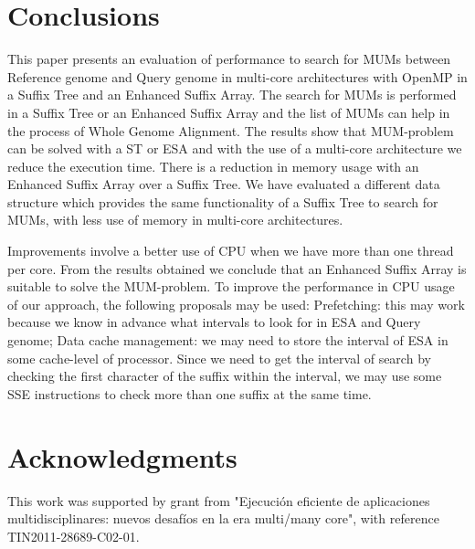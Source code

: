 \documentclass[runningheads,a5paper]{llncs}
\begin{document}
\section{Conclusions}
This paper presents an evaluation of performance to search for MUMs between Reference genome and Query genome in multi-core architectures with OpenMP in a Suffix Tree and an Enhanced Suffix Array. The search for MUMs is performed in a Suffix Tree or an Enhanced Suffix Array and the list of MUMs can help in the process of Whole Genome Alignment. The results show that MUM-problem can be solved with a ST or ESA and with the use of a multi-core architecture we reduce the execution time. There is a reduction in memory usage with an Enhanced Suffix Array over a Suffix Tree. We have evaluated a different data structure which provides the same functionality of a Suffix Tree to search for MUMs, with less use of memory in multi-core architectures.

Improvements involve a better use of CPU when we have more than one thread per core. From the results obtained we conclude that an Enhanced Suffix Array is suitable to solve the MUM-problem. To improve the performance in CPU usage of our approach, the following proposals may be used: Prefetching: this may work because we know in advance what intervals to look for in ESA and Query genome; Data cache management: we may need to store the interval of ESA in some cache-level of processor. Since we need to get the interval of search by checking the first character of the suffix within the interval, we may use some SSE instructions to check more than one suffix at the same time.
\section{Acknowledgments}
This work was supported by grant from "Ejecuci\'on eficiente de aplicaciones multidisciplinares: nuevos desaf\'ios en la era multi/many core", with reference TIN2011-28689-C02-01.

  
\end{document}
